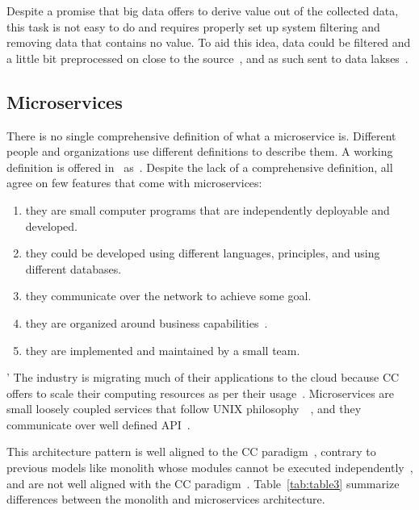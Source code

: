 Despite a promise that big data offers to derive value out of the collected data, this task is not easy to do and requires properly set up system filtering and removing data that contains no value. To aid this idea, data could be filtered and a little bit preprocessed on close to the source~\cite{inproceedingsSimic1}, and as such sent to data lakses~\cite{MarynowskiSP15}.
%
%
\subsection{Microservices}\label{sec:microservices}
%
There is no single comprehensive definition of what a microservice is. Different people and organizations use different definitions to describe them. A working definition is offered in~\cite{DragoniGLMMMS16} as~. Despite the lack of a comprehensive definition, all agree on few features that come with microservices:

\begin{enumerate}[start=1,label={(\bfseries \arabic*)}]
	\item they are small computer programs that are independently deployable and developed.
	\item they could be developed using different languages, principles, and using different databases.
	\item they communicate over the network to achieve some goal.
	\item they are organized around business capabilities~\cite{PautassoZALJ17}.
	\item they are implemented and maintained by a small team.
\end{enumerate}

'\noindent
The industry is migrating much of their applications to the cloud because CC offers to scale their computing resources as per their usage~\cite{LiZJLZLGGS19}. Microservices are small loosely coupled services that follow UNIX philosophy~~\cite{krause2015microservices}, and they communicate over well defined API~\cite{DragoniGLMMMS16}.

This architecture pattern is well aligned to the CC paradigm~\cite{LiZJLZLGGS19}, contrary to previous models like monolith whose modules cannot be executed independently~\cite{DragoniGLMMMS16, abs-1905-07997}, and are not well aligned with the CC paradigm~\cite{abs-1905-07997}. Table~\ref{tab:table3} summarize differences between the monolith and microservices architecture.

